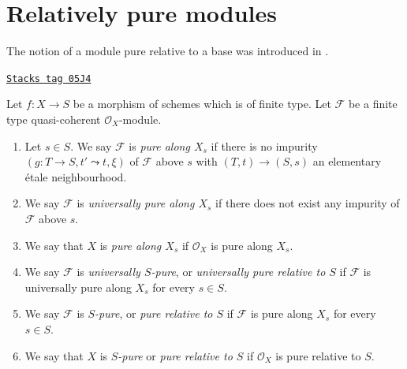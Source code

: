 \section{Relatively pure modules}
\label{flat-section-pure}
The notion of a module pure relative to a base was introduced in \cite{GruRay}.

\begin{definition}[Pure]
\label{flat-definition-pure}
\href{https://stacks.math.columbia.edu/tag/05J4}{\texttt{Stacks tag 05J4}}

Let $f : X \to S$ be a morphism of schemes which is of finite type.
Let $\mathcal{F}$ be a finite type quasi-coherent $\mathcal{O}_X$-module.
\begin{enumerate}
\item Let $s \in S$. We say $\mathcal{F}$ is {\it pure along $X_s$}
if there is no impurity $(g : T \to S, t' \leadsto t, \xi)$
of $\mathcal{F}$ above $s$ with $(T, t) \to (S, s)$ an
elementary \'etale neighbourhood.
\item We say $\mathcal{F}$ is {\it universally pure along $X_s$}
if there does not exist any impurity of $\mathcal{F}$ above $s$.
\item We say that $X$ is {\it pure along $X_s$} if $\mathcal{O}_X$
is pure along $X_s$.
\item We say $\mathcal{F}$ is {\it universally $S$-pure}, or
{\it universally pure relative to $S$} if $\mathcal{F}$ is universally
pure along $X_s$ for every $s \in S$.
\item We say $\mathcal{F}$ is {\it $S$-pure}, or
{\it pure relative to $S$} if $\mathcal{F}$ is pure along $X_s$
for every $s \in S$.
\item We say that $X$ is {\it $S$-pure} or {\it pure relative to $S$}
if $\mathcal{O}_X$ is pure relative to $S$.
\end{enumerate}
\end{definition}

